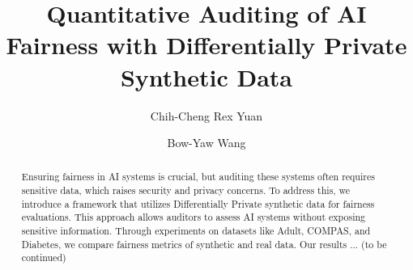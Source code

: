 \documentclass[manuscript,screen,review,anonymous]{acmart}
\begin{document}
\title{Quantitative Auditing of AI Fairness with Differentially Private Synthetic Data}

\author{Chih-Cheng Rex Yuan}

\author{Bow-Yaw Wang}


\begin{abstract}
Ensuring fairness in AI systems is crucial, but auditing these systems often requires sensitive data, which raises security and privacy concerns. To address this, we introduce a framework that utilizes Differentially Private synthetic data for fairness evaluations. This approach allows auditors to assess AI systems without exposing sensitive information. Through experiments on datasets like Adult, COMPAS, and Diabetes, we compare fairness metrics of synthetic and real data. Our results ... (to be continued)
\end{abstract}
\end{document}
